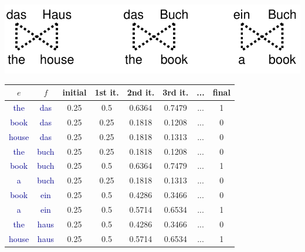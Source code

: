 \documentclass[landscape]{slides}
\newcommand{\example}[1]{\textcolor{darkblue}{\rm #1}}
\begin{document}
\begin{center}\vspace{-3mm}
\includegraphics[scale=1.2]{em-model1-corpus.pdf}
\begin{tabular}{|c|c||c|c|c|c|c|c|} \hline
$e$ & $f$ & initial & 1st it. & 2nd it. & 3rd it. & ... & final \\ \hline \hline
\example{the} & \example{das} & 0.25 & 0.5 & 0.6364 & 0.7479 & ... & 1 \\ \hline
\example{book} & \example{das} & 0.25 & 0.25 & 0.1818 & 0.1208 & ... & 0 \\ \hline
\example{house} & \example{das} & 0.25 & 0.25 & 0.1818 & 0.1313 & ... &0 \\ \hline
\example{the} & \example{buch} & 0.25 & 0.25 & 0.1818 & 0.1208 & ... & 0 \\ \hline
\example{book} & \example{buch} & 0.25 & 0.5 & 0.6364 & 0.7479 & ... & 1 \\ \hline 
\example{a} & \example{buch} & 0.25 & 0.25 & 0.1818 & 0.1313 & ... & 0 \\ \hline
\example{book} & \example{ein} & 0.25 & 0.5 & 0.4286 & 0.3466 & ...&  0 \\ \hline
\example{a} & \example{ein} & 0.25 & 0.5 &  0.5714 & 0.6534 & ...& 1 \\ \hline
\example{the} & \example{haus} & 0.25 & 0.5 &  0.4286 & 0.3466 & ...&  0 \\ \hline
\example{house} & \example{haus} & 0.25 & 0.5 &  0.5714 & 0.6534 & ...& 1 \\ \hline
\end{tabular}
\end{center}



\end{document}
